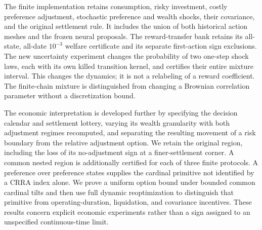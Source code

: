The finite implementation retains consumption, risky investment, costly preference adjustment, stochastic preference and wealth shocks, their covariance, and the original settlement rule. It includes the union of both historical action meshes and the frozen neural proposals. The reward-transfer bank retains its all-state, all-date $10^{-3}$ welfare certificate and its separate first-action sign exclusions. The new uncertainty experiment changes the probability of two one-step shock laws, each with its own killed transition kernel, and certifies their entire mixture interval. This changes the dynamics; it is not a relabeling of a reward coefficient. The finite-chain mixture is distinguished from changing a Brownian correlation parameter without a discretization bound.

The economic interpretation is developed further by specifying the decision calendar and settlement lottery, varying its wealth granularity with both adjustment regimes recomputed, and separating the resulting movement of a risk boundary from the relative adjustment option. We retain the original region, including the loss of its no-adjustment sign at a finer-settlement corner. A common nested region is additionally certified for each of three finite protocols. A preference over preference states supplies the cardinal primitive not identified by a CRRA index alone. We prove a uniform option bound under bounded common cardinal tilts and then use full dynamic reoptimization to distinguish that primitive from operating-duration, liquidation, and covariance incentives. These results concern explicit economic experiments rather than a sign assigned to an unspecified continuous-time limit.

